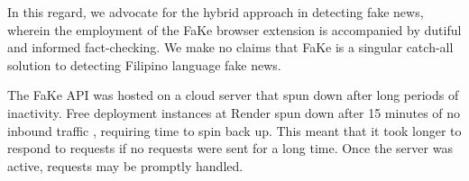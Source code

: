 In this regard, we advocate for the hybrid approach in detecting fake news, wherein the employment of the FaKe browser extension is accompanied by dutiful and informed fact-checking. We make no claims that FaKe is a singular catch-all solution to detecting Filipino language fake news.

The FaKe API was hosted on a cloud server that spun down after long periods of inactivity. Free deployment instances at Render spun down after 15 minutes of no inbound traffic \cite{render-docs}, requiring time to spin back up. This meant that it took longer to respond to requests if no requests were sent for a long time. Once the server was active, requests may be promptly handled.
